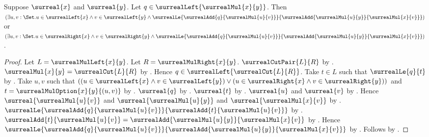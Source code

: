 \begin{theorem}\label{surreal_mul_left_interpolation}
    Suppose $\surreal{x}$ and $\surreal{y}$.
    Let $q\in\surrealLeft{\surrealMul{x}{y}}$.
    Then
        $(\exists u,v:\Set.
            u\in\surrealLeft{x}\land v\in\surrealLeft{y}\land
            \surrealLe{
                \surrealAdd{q}{\surrealMul{u}{v}}}{
                \surrealAdd{\surrealMul{u}{y}}{\surrealMul{x}{v}}})$
        or
        $(\exists u,v:\Set.
            u\in\surrealRight{x}\land v\in\surrealRight{y}\land
            \surrealLe{
                \surrealAdd{q}{\surrealMul{u}{v}}}{
                \surrealAdd{\surrealMul{u}{y}}{\surrealMul{x}{v}}})$.
\end{theorem}
\begin{proof}
    Let $L=\surrealMulLeft{x}{y}$.
    Let $R=\surrealMulRight{x}{y}$.
    $\surrealCutPair{L}{R}$ by .
    $\surrealMul{x}{y}=\surrealCut{L}{R}$
        by .
    Hence $q\in\surrealLeft{\surrealCut{L}{R}}$.
    Take $t\in L$ such that $\surrealLe{q}{t}$
        by .
    Take $u,v$ such that
        $((u\in\surrealLeft{x}\land v\in\surrealLeft{y})
          \lor(u\in\surrealRight{x}\land v\in\surrealRight{y}))$
        and $t=\surrealMulOption{x}{y}{(u,v)}$
        by .
    $\surreal{q}$ by
        .
    $\surreal{t}$ by .
    $\surreal{u}$ and $\surreal{v}$
        by .
    Hence $\surreal{\surrealMul{u}{v}}$ and
        $\surreal{\surrealMul{u}{y}}$ and
        $\surreal{\surrealMul{x}{v}}$
        by .
    $\surrealLe{
        \surrealAdd{q}{\surrealMul{u}{v}}}{
        \surrealAdd{t}{\surrealMul{u}{v}}}$
        by .
    $\surrealAdd{t}{\surrealMul{u}{v}}
        =\surrealAdd{\surrealMul{u}{y}}{\surrealMul{x}{v}}$
        by .
    Hence $\surrealLe{
        \surrealAdd{q}{\surrealMul{u}{v}}}{
        \surrealAdd{\surrealMul{u}{y}}{\surrealMul{x}{v}}}$
        by \auto.
    Follows by \auto.
\end{proof}

